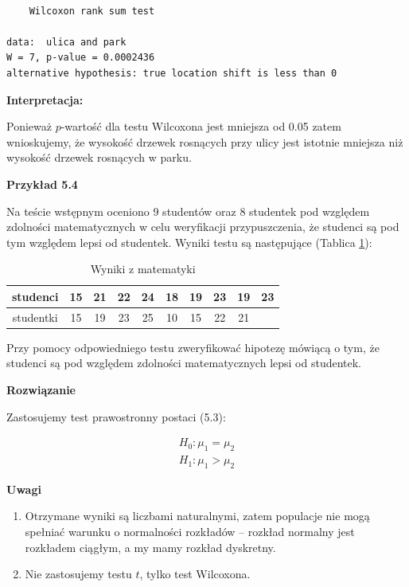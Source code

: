 \documentclass[12pt,B5paper,]{book}
\begin{document}
\begin{verbatim}

    Wilcoxon rank sum test

data:  ulica and park
W = 7, p-value = 0.0002436
alternative hypothesis: true location shift is less than 0
\end{verbatim}

\vspace{0.8cm} \textbf{Interpretacja:}

Ponieważ \(p\)-wartość dla testu Wilcoxona jest mniejsza od 0.05 zatem
wnioskujemy, że wysokość drzewek rosnących przy ulicy jest istotnie
mniejsza niż wysokość drzewek rosnących w parku.

\vspace{0.8cm} \textbf{Przykład 5.4}

Na teście wstępnym oceniono 9 studentów oraz 8 studentek pod względem
zdolności matematycznych w celu weryfikacji przypuszczenia, że studenci
są pod tym względem lepsi od studentek. Wyniki testu są następujące
(Tablica \ref{studenci}):

\begin{table}[H]
\centering
\caption{Wyniki z matematyki}
\label{studenci}
\begin{tabular}{cccccccccc}
studenci  & 15 & 21 & 22 & 24 & 18 & 19 & 23 & 19 & 23 \\ \hline
studentki & 15 & 19 & 23 & 25 & 10 & 15 & 22 & 21 &   \\ 
\end{tabular}
\end{table}

Przy pomocy odpowiedniego testu zweryfikować hipotezę mówiącą o tym, że
studenci są pod względem zdolności matematycznych lepsi od studentek.

\newpage

\textbf{Rozwiązanie}

Zastosujemy test prawostronny postaci (5.3): \vspace{-0.6cm}

\begin{align*}
        H_0: \mu_1 = \mu_2 \\
        H_1: \mu_1 > \mu_2
\end{align*}

\textbf{Uwagi}

\begin{enumerate}
\def\labelenumi{\arabic{enumi})}
\item
  Otrzymane wyniki są liczbami naturalnymi, zatem populacje nie mogą
  spełniać warunku o normalności rozkładów -- rozkład normalny jest
  rozkładem ciągłym, a my mamy rozkład dyskretny.
\item
  Nie zastosujemy testu \(t\), tylko test Wilcoxona.
\end{enumerate}
\end{document}
